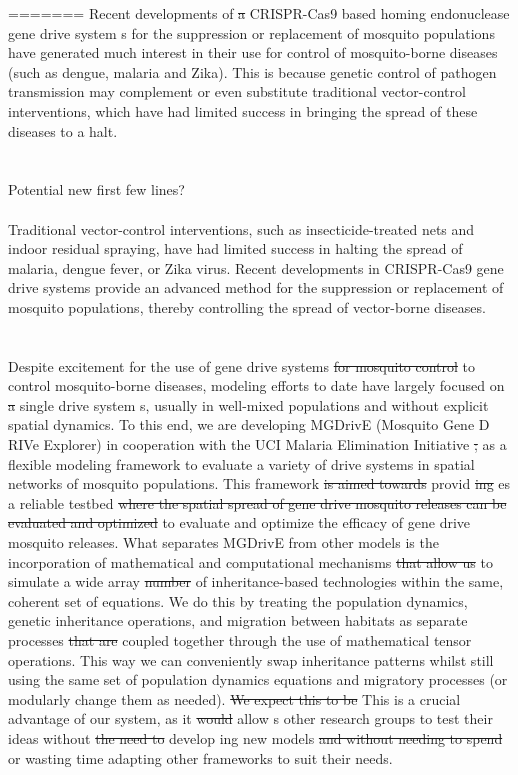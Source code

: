 \documentclass[11pt]{amsart}
\begin{document}
=======
Recent developments of {\color{red} \st{a}} CRISPR-Cas9 based homing endonuclease gene drive system{\color{green} s} for the suppression or replacement of mosquito populations have generated much interest in their use for control of mosquito-borne diseases (such as dengue, malaria and {\color{green} Z}ika). This is because genetic control of pathogen transmission may complement or even substitute traditional vector-control interventions,  which have had limited success in bringing the spread of these diseases to a halt.
\\ \\ \\
{\color{green} Potential new first few lines? \\ \\ Traditional vector-control interventions, such as insecticide-treated nets and indoor residual spraying, have had limited success in halting the spread of malaria, dengue fever, or Zika virus. Recent developments in CRISPR-Cas9 gene drive systems provide an advanced method for the suppression or replacement of mosquito populations, thereby controlling the spread of vector-borne diseases. } 
\\ \\ \\
Despite excitement for the use of gene drive systems {\color{red} \st{for mosquito control}}{\color{green} to control mosquito-borne diseases}, modeling efforts to date have largely focused on {\color{red} \st{a}} single drive system{\color{green} s}, usually in well-mixed populations and without explicit spatial dynamics. To this end, we are developing MGDrivE (Mosquito Gene D{\color{green} RIV}e Explorer) in cooperation with the UCI Malaria Elimination Initiative{\color{red} \st{;}} as a flexible modeling framework to evaluate a variety of drive systems in spatial networks of mosquito populations. This framework {\color{red} \st{is aimed towards}} provid{\color{red} \st{ing}}{\color{green} es} a reliable testbed {\color{red} \st{where the spatial spread of gene drive mosquito releases can be evaluated and optimized}} {\color{green} to evaluate and optimize the efficacy of gene drive mosquito releases}. What separates MGDrivE from other models is the incorporation of mathematical and computational mechanisms {\color{red} \st{that allow us}} to simulate a wide array {\color{red} \st{number}} of inheritance-based technologies within the same, coherent set of equations. We do this by treating the population dynamics, genetic inheritance operations, and migration between habitats as separate processes{\color{red} \st{that are}} coupled together through the use of mathematical tensor operations. This way we can conveniently swap inheritance patterns whilst still using the same set of population dynamics equations and migratory processes (or modularly change them as needed). {\color{red} \st{We expect this to be}}{\color{green} This is} a crucial advantage of our system, as it {\color{red} \st{would}} allow{\color{green} s} other research groups to test their ideas without {\color{red} \st{the need to}} develop{\color{green} ing} new models {\color{red} \st{and without needing to spend}} {\color{green} or wasting} time adapting other frameworks to suit their needs.
\end{document}
